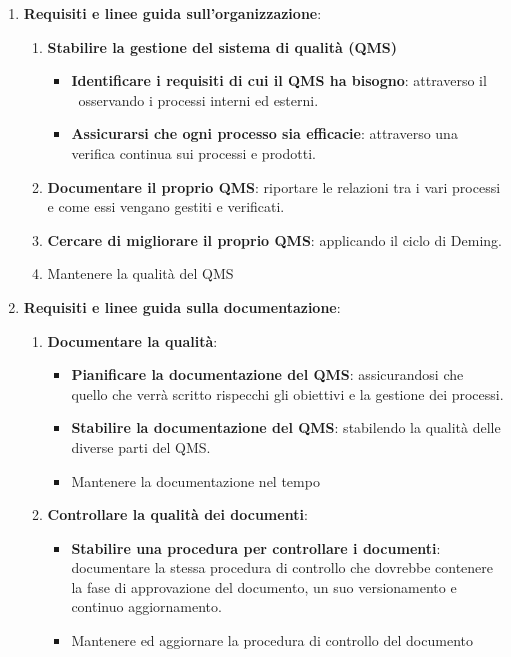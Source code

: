 	\begin{enumerate}
		\item \textbf{Requisiti e linee guida sull'organizzazione}:
		\begin{enumerate}
			\item \textbf{Stabilire la gestione del sistema di qualità (QMS)}
			\begin{itemize}
				\item \textbf{Identificare i requisiti di cui il QMS ha bisogno}: attraverso il \PdQ~osservando i processi interni ed esterni.
				\item \textbf{Assicurarsi che ogni processo sia efficacie}: attraverso una verifica continua sui processi e prodotti.
			\end{itemize}
			\item \textbf{Documentare il proprio QMS}: riportare le relazioni tra i vari processi e come essi vengano gestiti e verificati.
			\item \textbf{Cercare di migliorare il proprio QMS}: applicando il ciclo di Deming.
			\item Mantenere la qualità del QMS
		\end{enumerate} 
		
		\item \textbf{Requisiti e linee guida sulla documentazione}:
		\begin{enumerate}
			\item \textbf{Documentare la qualità}:
			\begin{itemize}
				\item \textbf{Pianificare la documentazione del QMS}: assicurandosi che quello che verrà scritto rispecchi gli obiettivi e la gestione dei processi.
				\item \textbf{Stabilire la documentazione del QMS}: stabilendo la qualità delle diverse parti del QMS.
				\item Mantenere la documentazione nel tempo
			\end{itemize}
			
			\item \textbf{Controllare la qualità dei documenti}:
			\begin{itemize}
				\item \textbf{Stabilire una procedura per controllare i documenti}: documentare la stessa procedura di controllo che dovrebbe contenere la fase di approvazione del documento, un suo versionamento e continuo aggiornamento.
				\item Mantenere ed aggiornare la procedura di controllo del documento
			\end{itemize}
		\end{enumerate}
	\end{enumerate}

